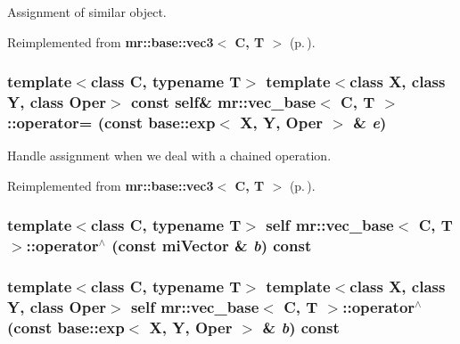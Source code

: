 Assignment of similar object. 



Reimplemented from {\bf mr::base::vec3$<$ C, T $>$} {\rm (p.\,\pageref{structmr_1_1base_1_1vec3_z36_1})}.
\subsubsection{\setlength{\rightskip}{0pt plus 5cm}template$<$class C, typename T$>$ template$<$class X, class Y, class Oper$>$ const {\bf self}\& {\bf mr::vec\_\-base}$<$ C, T $>$::operator= (const {\bf base::exp}$<$ X, Y, Oper $>$ \& {\em e})\hspace{0.3cm}{\tt  [inline]}}\label{structmr_1_1vec__base_z60_0}


Handle assignment when we deal with a chained operation. 



Reimplemented from {\bf mr::base::vec3$<$ C, T $>$} {\rm (p.\,\pageref{structmr_1_1base_1_1vec3_z36_0})}.
\subsubsection{\setlength{\rightskip}{0pt plus 5cm}template$<$class C, typename T$>$ {\bf self} {\bf mr::vec\_\-base}$<$ C, T $>$::operator$^\wedge$ (const mi\-Vector \& {\em b}) const\hspace{0.3cm}{\tt  [inline]}}\label{structmr_1_1vec__base_z62_4}


\subsubsection{\setlength{\rightskip}{0pt plus 5cm}template$<$class C, typename T$>$ template$<$class X, class Y, class Oper$>$ {\bf self} {\bf mr::vec\_\-base}$<$ C, T $>$::operator$^\wedge$ (const {\bf base::exp}$<$ X, Y, Oper $>$ \& {\em b}) const\hspace{0.3cm}{\tt  [inline]}}\label{structmr_1_1vec__base_z62_3}


